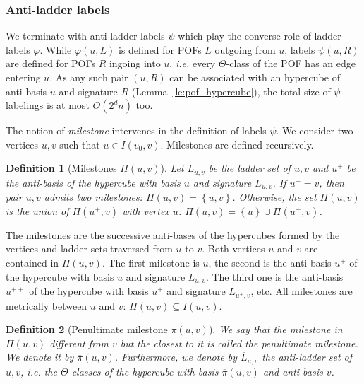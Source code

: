 \documentclass{article}
\newtheorem{definition}{Definition}
\newcommand{\set}[1]{\left\{ #1 \right\}}
\begin{document}
\subsubsection{Anti-ladder labels} \label{subsubsec:anti_ladder}

 We terminate with anti-ladder labels $\psi$ which play the converse role of ladder labels $\varphi$. While $\varphi(u,L)$ is defined for POFs $L$ outgoing from $u$, labels $\psi(u,R)$ are defined for POFs $R$ ingoing into $u$, {\em i.e.} every $\Theta$-class of the POF has an edge entering $u$. As any such pair $(u,R)$ can be associated with an hypercube of anti-basis $u$ and signature $R$ (Lemma~\ref{le:pof_hypercube}), the total size of $\psi$-labelings is at most $O(2^dn)$ too.

The notion of \textit{milestone} intervenes in the definition of labels $\psi$. We consider two vertices $u,v$ such that $u \in I(v_0,v)$. Milestones are defined recursively.

\begin{definition}[Milestones $\Pi(u,v)$]
Let $L_{u,v}$ be the ladder set of $u,v$ and $u^+$ be the anti-basis of the hypercube with basis $u$ and signature $L_{u,v}$.
If $u^+ = v$, then pair $u,v$ admits two milestones: $\Pi(u,v) = \set{u,v}$. Otherwise, the set $\Pi(u,v)$ is the union of $\Pi(u^+,v)$ with vertex $u$: $\Pi(u,v) = \set{u} \cup \Pi(u^+,v)$.
\label{def:milestones}
\end{definition}

The milestones are the successive anti-bases of the hypercubes formed by the vertices and ladder sets traversed from $u$ to $v$. Both vertices $u$ and $v$ are contained in $\Pi(u,v)$. The first milestone is $u$, the second is the anti-basis $u^+$ of the hypercube with basis $u$ and signature $L_{u,v}$. The third one is the anti-basis $u^{++}$ of the hypercube with basis $u^+$ and signature $L_{u^+,v}$, etc. All milestones are metrically between $u$ and $v$: $\Pi(u,v) \subseteq I(u,v)$. 

\begin{definition}[Penultimate milestone $\overline{\pi}(u,v)$]
We say that the milestone in $\Pi(u,v)$ different from $v$ but the closest to it is called the \textit{penultimate milestone}. We denote it by $\overline{\pi}(u,v)$. Furthermore, we denote by $\overline{L}_{u,v}$ the \emph{anti-ladder set} of $u,v$, {\em i.e.} the $\Theta$-classes of the hypercube with basis $\overline{\pi}(u,v)$ and anti-basis $v$. 
\end{definition}
\end{document}
